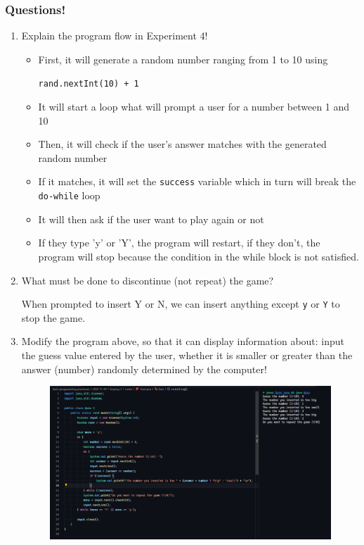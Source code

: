 \documentclass[12pt,titlepage]{article}
\begin{document}
\subsubsection*{Questions!}
\begin{enumerate}
    \item {
        Explain the program flow in Experiment 4!

        \begin{itemize}
            \item {
                First, it will generate a random number ranging from 1 to 10 using
                
                \texttt{rand.nextInt(10) + 1}
            }
            \item It will start a loop what will prompt a user for a number between 1 and 10
            \item Then, it will check if the user's answer matches with the generated random number
            \item If it matches, it will set the \texttt{success} variable which in turn will break the \texttt{do-while} loop
            \item It will then ask if the user want to play again or not
            \item If they type 'y' or 'Y', the program will restart, if they don't, the program will stop because the condition in the while block is not satisfied.
        \end{itemize}
    }
    \item {
        What must be done to discontinue (not repeat) the game?

        When prompted to insert Y or N, we can insert anything except \texttt{y} or \texttt{Y} to stop the game.
    }
    \pagebreak
    \item {
        Modify the program above, so that it can display information about: input the guess 
        value entered by the user, whether it is smaller or greater than the answer (number) 
        randomly determined by the computer!

        \begin{figure}[h]
            \centering
            \includegraphics[width=.8\textwidth]{./images/quiz-modified.png}
        \end{figure}
    }
\end{enumerate}
\end{document}
